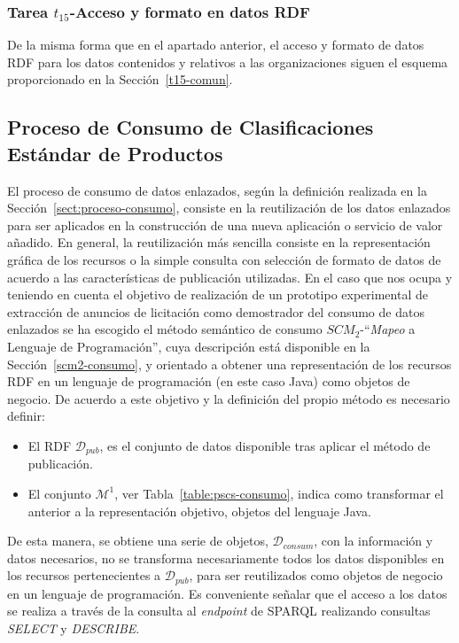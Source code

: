\subsubsection{Tarea $t_{15}$-Acceso y formato en datos RDF}
De la misma forma que en el apartado anterior, el acceso y formato de datos RDF para los datos contenidos y relativos 
a las organizaciones siguen el esquema proporcionado en la Sección~\ref{t15-comun}.

\subsection{Proceso de Consumo de Clasificaciones Estándar de Productos}
El proceso de consumo de datos enlazados, según la definición realizada en la Sección~\ref{sect:proceso-consumo}, consiste en 
la reutilización de los datos enlazados para ser aplicados en la construcción de una nueva aplicación o servicio de valor 
añadido. En general, la reutilización más sencilla consiste en la representación gráfica de los recursos o la simple 
consulta con selección de formato de datos de acuerdo a las características de publicación utilizadas. En el caso 
que nos ocupa y teniendo en cuenta el objetivo de realización de un prototipo experimental de extracción de anuncios 
de licitación como demostrador del consumo de datos enlazados se ha escogido el método semántico de consumo $SCM_2$-``\textit{Mapeo} a Lenguaje de Programación'', 
cuya descripción está disponible en la Sección~\ref{scm2-consumo}, y orientado a obtener una representación de los recursos RDF en un 
lenguaje de programación (en este caso Java) como objetos de negocio. De acuerdo a este objetivo y la definición del propio método 
es necesario definir:
\begin{itemize}
 \item El \dataset RDF $\mathcal{D}_{pub}$, es el conjunto de datos disponible tras aplicar el método de publicación.
 \item El conjunto $\mathcal{M}^1$, ver Tabla~\ref{table:pscs-consumo}, indica como transformar el \dataset anterior a la representación objetivo, objetos del lenguaje Java.
\end{itemize}

De esta manera, se obtiene una serie de objetos, $\mathcal{D}_{consum}$, con la información y datos necesarios, no se transforma necesariamente todos los datos disponibles en los recursos pertenecientes 
a  $\mathcal{D}_{pub}$, para ser reutilizados como objetos de negocio en un lenguaje de programación. Es conveniente señalar que el acceso a los datos se realiza a través 
de la consulta al \textit{endpoint} de \gls{SPARQL} realizando consultas \textit{SELECT} y \textit{DESCRIBE}.

